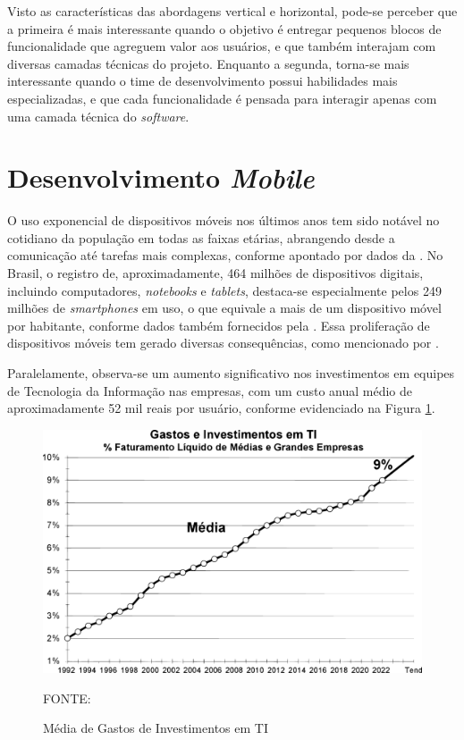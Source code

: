 Visto as características das abordagens vertical e horizontal, pode-se perceber que
a primeira é mais interessante quando o objetivo é entregar pequenos blocos de funcionalidade
que agreguem valor aos usuários, e que também interajam com diversas camadas
técnicas do projeto. Enquanto a segunda, torna-se mais interessante quando o time de desenvolvimento
possui habilidades mais especializadas, e que cada funcionalidade é pensada
para interagir apenas com uma camada técnica do \textit{software}.

\section{Desenvolvimento \textit{Mobile}}
\label{sectionMobile}

O uso exponencial de dispositivos móveis nos últimos anos tem sido notável no cotidiano da população em todas as faixas etárias, 
abrangendo desde a comunicação até tarefas mais complexas, conforme apontado por dados da \cite{FGV}. No Brasil, o registro de, 
aproximadamente, 464 milhões de dispositivos digitais, incluindo computadores, \textit{notebooks} e \textit{tablets}, destaca-se 
especialmente pelos 249 milhões de \textit{smartphones} em uso, o que equivale a mais de um dispositivo móvel por habitante, conforme dados 
também fornecidos pela \cite{FGV}. Essa proliferação de dispositivos móveis tem gerado diversas consequências, como mencionado por 
\cite{coutinho2014era}.

Paralelamente, observa-se um aumento significativo nos investimentos em equipes de Tecnologia da Informação nas empresas, com um 
custo anual médio de aproximadamente 52 mil reais por usuário, conforme evidenciado na Figura \ref{fig_dev_mobile}.

\begin{figure}[h]
	\centering
	\caption{Média de Gastos de Investimentos em TI}
	\includegraphics[keepaspectratio=true,scale=0.2]{figuras/fig_dev_mobile.eps}
    \parbox{\linewidth}{\centering FONTE: \cite{FGV}}
	\label{fig_dev_mobile}
\end{figure}

